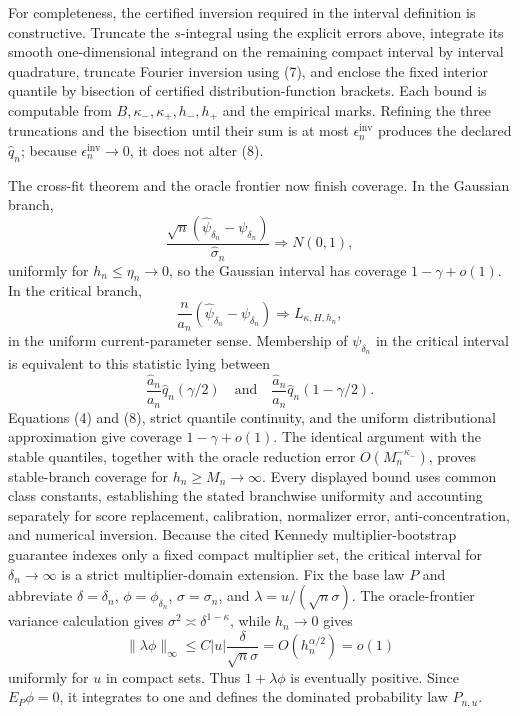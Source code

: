 For completeness, the certified inversion required in the interval definition is constructive.  Truncate the \(s\)-integral using the explicit errors above, integrate its smooth one-dimensional integrand on the remaining compact interval by interval quadrature, truncate Fourier inversion using (7), and enclose the fixed interior quantile by bisection of certified distribution-function brackets.  Each bound is computable from \(B,\kappa_-,\kappa_+,h_-,h_+\) and the empirical marks.  Refining the three truncations and the bisection until their sum is at most \(\epsilon_n^{\mathrm{inv}}\) produces the declared \(\widehat q_n\); because \(\epsilon_n^{\mathrm{inv}}\to0\), it does not alter (8).

The cross-fit theorem and the oracle frontier now finish coverage.  In the Gaussian branch,
\[
 \frac{\sqrt n(\widehat\psi_{\delta_n}-\psi_{\delta_n})}{\widehat\sigma_n}
 \Rightarrow N(0,1),
\]
uniformly for \(h_n\leq\eta_n\to0\), so the Gaussian interval has coverage \(1-\gamma+o(1)\).  In the critical branch,
\[
 \frac n{a_n}(\widehat\psi_{\delta_n}-\psi_{\delta_n})
 \Rightarrow L_{\kappa,H,h_n},
\]
in the uniform current-parameter sense.  Membership of \(\psi_{\delta_n}\) in the critical interval is equivalent to this statistic lying between
\[
 \frac{\widehat a_n}{a_n}\widehat q_n(\gamma/2)
 \quad\text{and}\quad
 \frac{\widehat a_n}{a_n}\widehat q_n(1-\gamma/2).
\]
Equations (4) and (8), strict quantile continuity, and the uniform distributional approximation give coverage \(1-\gamma+o(1)\).  The identical argument with the stable quantiles, together with the oracle reduction error \(O(M_n^{-\kappa_-})\), proves stable-branch coverage for \(h_n\geq M_n\to\infty\).  Every displayed bound uses common class constants, establishing the stated branchwise uniformity and accounting separately for score replacement, calibration, normalizer error, anti-concentration, and numerical inversion.  Because the cited Kennedy multiplier-bootstrap guarantee indexes only a fixed compact multiplier set, the critical interval for \(\delta_n\to\infty\) is a strict multiplier-domain extension.
Fix the base law \(P\) and abbreviate \(\delta=\delta_n\), \(\phi=\phi_{\delta_n}\), \(\sigma=\sigma_n\), and \(\lambda=u/(\sqrt n\sigma)\).  The oracle-frontier variance calculation gives \(\sigma^2\asymp\delta^{1-\kappa}\), while \(h_n\to0\) gives
\[
 \|\lambda\phi\|_\infty\leq C|u|\frac{\delta}{\sqrt n\sigma}
 =O(h_n^{\alpha/2})=o(1) \tag{1}
\]
uniformly for \(u\) in compact sets.  Thus \(1+\lambda\phi\) is eventually positive.  Since \(E_P\phi=0\), it integrates to one and defines the dominated probability law \(P_{n,u}\).

